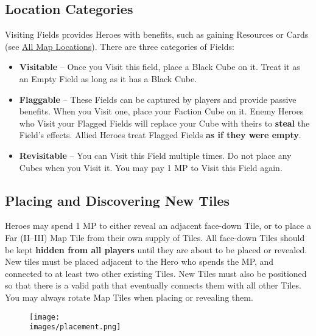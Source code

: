 \begin{multicols}{2}

\subsection*{\hypertarget{Categories}{Location Categories}}
Visiting Fields provides Heroes with benefits, such as gaining Resources or Cards (see \hyperlink{All Map Locations}{All Map Locations}).
There are three categories of Fields:
\begin{itemize}
  \item \textbf{Visitable} – Once you Visit this field, place a Black Cube on it.
    Treat it as an Empty Field as long as it has a Black Cube.
  \item \textbf{Flaggable} – These Fields can be captured by players and provide passive benefits.
    When you Visit one, place your Faction Cube on it.
    Enemy Heroes who Visit your Flagged Fields will replace your Cube with theirs to \textbf{steal} the Field’s effects.
    Allied Heroes treat Flagged Fields \textbf{as if they were empty}.
  \item \textbf{Revisitable} – You can Visit this Field multiple times.
    Do not place any Cubes when you Visit it.
    You may pay 1 MP to Visit this Field again.
\end{itemize}

\subsection*{\hypertarget{Placing}{Placing and Discovering New Tiles}}
Heroes may spend 1 MP to either reveal an adjacent face-down Tile, or to place a Far (II–III) Map Tile from their own supply of Tiles.
All face-down Tiles should be kept \textbf{hidden from all players} until they are about to be placed or revealed.
New tiles must be placed adjacent to the Hero who spends the MP, and connected to at least two other existing Tiles.
New Tiles must also be positioned so that there is a valid path that eventually connects them with all other Tiles.
You may always rotate Map Tiles when placing or revealing them.

\medskip
{}

\end{multicols}

\begin{figure*}[!hb]
  \centering
  \texttt{[image: \\images/placement.png]}
\end{figure*}

